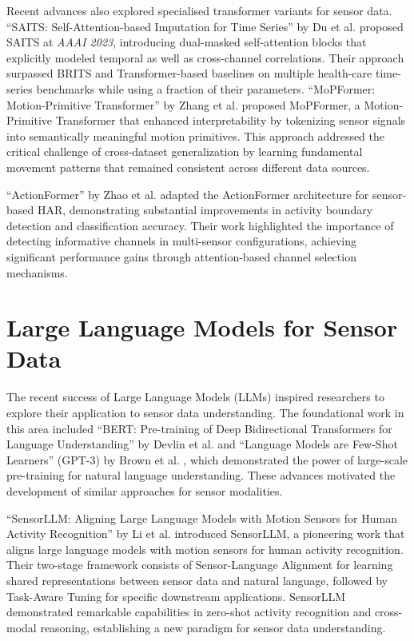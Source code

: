 Recent advances also explored specialised transformer variants for sensor data. ``SAITS: Self-Attention-based Imputation for Time Series'' by Du et al. \cite{Du2023SAITS} proposed SAITS at \textit{AAAI 2023}, introducing dual-masked self-attention blocks that explicitly modeled temporal as well as cross-channel correlations. Their approach surpassed BRITS and Transformer-based baselines on multiple health-care time-series benchmarks while using a fraction of their parameters. ``MoPFormer: Motion-Primitive Transformer'' by Zhang et al. \cite{Zhang2025MoPFormer} proposed MoPFormer, a Motion-Primitive Transformer that enhanced interpretability by tokenizing sensor signals into semantically meaningful motion primitives. This approach addressed the critical challenge of cross-dataset generalization by learning fundamental movement patterns that remained consistent across different data sources.

``ActionFormer'' by Zhao et al. \cite{Zhao2025ActionFormer} adapted the ActionFormer architecture for sensor-based HAR, demonstrating substantial improvements in activity boundary detection and classification accuracy. Their work highlighted the importance of detecting informative channels in multi-sensor configurations, achieving significant performance gains through attention-based channel selection mechanisms.

\section{Large Language Models for Sensor Data}

\hspace{2em}The recent success of Large Language Models (LLMs) inspired researchers to explore their application to sensor data understanding. The foundational work in this area included ``BERT: Pre-training of Deep Bidirectional Transformers for Language Understanding'' by Devlin et al. \cite{Devlin2019BERT} and ``Language Models are Few-Shot Learners'' (GPT-3) by Brown et al. \cite{Brown2020GPT3}, which demonstrated the power of large-scale pre-training for natural language understanding. These advances motivated the development of similar approaches for sensor modalities.

``SensorLLM: Aligning Large Language Models with Motion Sensors for Human Activity Recognition'' by Li et al. \cite{li2024sensorllm} introduced SensorLLM, a pioneering work that aligns large language models with motion sensors for human activity recognition. Their two-stage framework consists of Sensor-Language Alignment for learning shared representations between sensor data and natural language, followed by Task-Aware Tuning for specific downstream applications. SensorLLM demonstrated remarkable capabilities in zero-shot activity recognition and cross-modal reasoning, establishing a new paradigm for sensor data understanding.

